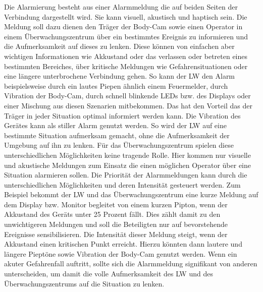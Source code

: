 \documentclass[thesis.tex]{subfiles}
\begin{document}
Die Alarmierung besteht aus einer Alarmmeldung die auf beiden Seiten der Verbindung dargestellt wird.
Sie kann visuell, akustisch und haptisch sein.
Die Meldung soll dazu dienen den Träger der Body-Cam sowie einen Operator in einem Überwachungszentrum über ein bestimmtes Ereignis zu informieren und die Aufmerksamkeit auf dieses zu lenken.
Diese können von einfachen aber wichtigen Informationen wie Akkustand oder das verlassen oder betreten eines bestimmten Bereiches, über kritische Meldungen wie Gefahrensituationen oder eine längere unterbrochene Verbindung gehen.
So kann der LW den Alarm beispielsweise durch ein lautes Piepen ähnlich einem Feuermelder, durch Vibration der Body-Cam, durch schnell blinkende LEDs bzw. des Displays oder einer Mischung aus diesen Szenarien mitbekommen.
Das hat den Vorteil das der Träger in jeder Situation optimal informiert werden kann.
Die Vibration des Gerätes kann als stiller Alarm genutzt werden.
So wird der LW auf eine bestimmte Situation aufmerksam gemacht, ohne die Aufmerksamkeit der Umgebung auf ihn zu lenken.
Für das Überwachungszentrum spielen diese unterschiedlichen Möglichkeiten keine tragende Rolle.
Hier kommen nur visuelle und akustische Meldungen zum Einsatz die einen möglichen Operator über eine Situation alarmieren sollen.
Die Priorität der Alarmmeldungen kann durch die unterschiedlichen Möglichkeiten und deren Intensität gesteuert werden.
Zum Beispiel bekommt der LW und das Überwachungszentrum eine kurze Meldung auf dem Display bzw. Monitor begleitet von einem kurzen Pipton, wenn der Akkustand des Geräts unter 25 Prozent fällt.
Dies zählt damit zu den unwichtigeren Meldungen und soll die Beteiligten nur auf bevorstehende Ereignisse sensibilisieren.
Die Intensität dieser Meldung steigt, wenn der Akkustand einen kritischen Punkt erreicht.
Hierzu könnten dann lautere und längere Pieptöne sowie Vibration der Body-Cam genutzt werden.
Wenn ein akuter Gefahrenfall auftritt, sollte sich die Alarmmeldung signifikant von anderen unterscheiden, um damit die volle Aufmerksamkeit des LW und des Überwachungszentrums auf die Situation zu lenken.
\\
\end{document}
